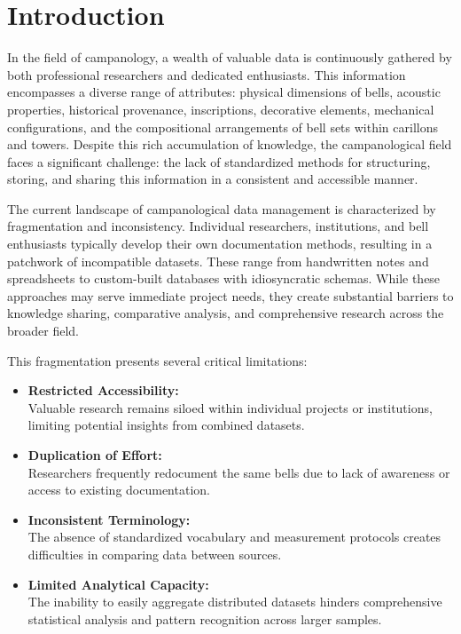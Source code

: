 \documentclass[11pt, a4paper]{article}
\begin{document}
\section{Introduction}

In the field of campanology, a wealth of valuable data is continuously gathered by both professional researchers and dedicated enthusiasts. This information encompasses a diverse range of attributes: physical dimensions of bells, acoustic properties, historical provenance, inscriptions, decorative elements, mechanical configurations, and the compositional arrangements of bell sets within carillons and towers. Despite this rich accumulation of knowledge, the campanological field faces a significant challenge: the lack of standardized methods for structuring, storing, and sharing this information in a consistent and accessible manner.

The current landscape of campanological data management is characterized by fragmentation and inconsistency. Individual researchers, institutions, and bell enthusiasts typically develop their own documentation methods, resulting in a patchwork of incompatible datasets. These range from handwritten notes and spreadsheets to custom-built databases with idiosyncratic schemas. While these approaches may serve immediate project needs, they create substantial barriers to knowledge sharing, comparative analysis, and comprehensive research across the broader field.

This fragmentation presents several critical limitations:

\begin{itemize}
    \item \textbf{Restricted Accessibility:} \\
        Valuable research remains siloed within individual projects or institutions, limiting potential insights from combined datasets.
    \item \textbf{Duplication of Effort:} \\
        Researchers frequently redocument the same bells due to lack of awareness or access to existing documentation.
    \item \textbf{Inconsistent Terminology:} \\
        The absence of standardized vocabulary and measurement protocols creates difficulties in comparing data between sources.
    \item \textbf{Limited Analytical Capacity:} \\
        The inability to easily aggregate distributed datasets hinders comprehensive statistical analysis and pattern recognition across larger samples.
\end{itemize}
\end{document}
